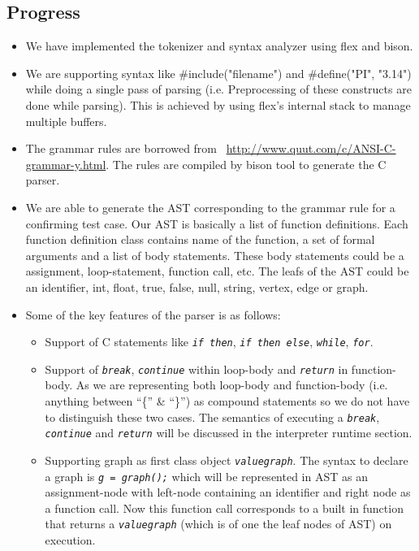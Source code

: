 \documentclass[12,twoside]{article}
\begin{document}
  \subsection{Progress}
  \begin{itemize}
    \item We have implemented the tokenizer and syntax analyzer using flex and 
    bison.  
    \item We are supporting syntax like \#include("filename") and 
    \#define("PI", "3.14") while doing a single pass of parsing  (i.e. 
        Preprocessing of these constructs are done while parsing). This is 
    achieved by using flex's internal stack to manage multiple buffers.

    \item The grammar rules are borrowed from 
    ~\url{http://www.quut.com/c/ANSI-C-grammar-y.html}. The rules are compiled 
    by bison tool to generate the C parser. 

    \item  We are able to generate the AST corresponding to the grammar rule for 
    a confirming test case. Our AST is basically a list of 
    function definitions. Each function definition class contains name of the 
    function, a set of formal arguments and a list of body statements. These 
    body statements could be a assignment, loop-statement, function call, etc.
    The leafs of the AST could be an identifier, int, float, true, false, null, 
    string, vertex, edge or graph.

    \item Some of the key features of the parser is as follows:
    \begin{itemize}
      \item Support of C statements like  {\tt\emph{if then}}, {\tt\emph{if then 
        else}}, {\tt\emph{while}}, {\tt\emph{for}}. 

      \item Support of {\tt\emph{break}}, {\tt\emph{continue}} within loop-body 
      and {\tt\emph{return}} in function-body.
      As we are representing both loop-body and function-body (i.e. anything 
          between ``\{'' \& ``\}'') as compound statements so we do not have to
      distinguish these two cases. The semantics of executing a 
{\tt\emph{break}}, {\tt\emph{continue}} and {\tt\emph{return}} will be discussed 
in the interpreter runtime section.

      \item Supporting graph as first class object {\tt\emph{valuegraph}}.
      The syntax to declare a graph is {\tt\emph{g = graph();}} which will be 
      represented in AST as an assignment-node with left-node containing an 
      identifier and right
      node as a function call. Now this function call corresponds to a built in 
      function that returns a {\tt\emph{valuegraph}} (which is of one the leaf 
          nodes of AST) on execution.


\end{itemize}
\end{itemize}
\end{document}
